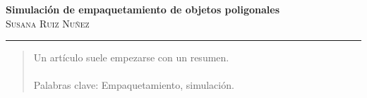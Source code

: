 \documentclass{article}
\begin{document}
	\begin{center}
	\huge{\textbf{Simulación de empaquetamiento de objetos poligonales}}\\
	
	\textsc{ \Large Susana Ruiz Nuñez}
	\end{center}


\begin{center}\rule{0.9\textwidth}{0.1mm} \end{center}
\begin{abstract}
	\normalsize Un artículo suele empezarse con un resumen.\\ \\
	Palabras clave: Empaquetamiento, simulación.

	\vspace*{0.5cm}
\end{abstract}
\end{document}
